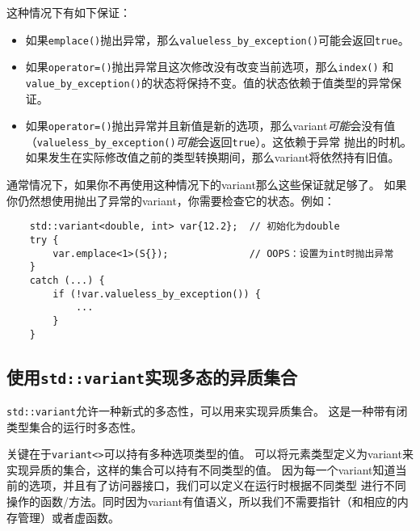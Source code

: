 这种情况下有如下保证：
\begin{itemize}[leftmargin=*]
    \item 如果\texttt{emplace()}抛出异常，那么\texttt{valueless\_by\_exception()}可能会返回\texttt{true}。
    \item 如果\texttt{operator=()}抛出异常且这次修改没有改变当前选项，那么\texttt{index()}
    和\texttt{value\_by\_exception()}的状态将保持不变。值的状态依赖于值类型的异常保证。
    \item 如果\texttt{operator=()}抛出异常并且新值是新的选项，那么variant\emph{可能}会没有值
    （\texttt{valueless\_by\_exception()}\emph{可能}会返回\texttt{true}）。这依赖于异常
    抛出的时机。如果发生在实际修改值之前的类型转换期间，那么variant将依然持有旧值。
\end{itemize}
通常情况下，如果你不再使用这种情况下的variant那么这些保证就足够了。
如果你仍然想使用抛出了异常的variant，你需要检查它的状态。例如：
\begin{lstlisting}
    std::variant<double, int> var{12.2};  // 初始化为double
    try {
        var.emplace<1>(S{});              // OOPS：设置为int时抛出异常
    }
    catch (...) {
        if (!var.valueless_by_exception()) {
            ...
        }
    }
\end{lstlisting}

\subsection{使用\texttt{std::variant}实现多态的异质集合}
\texttt{std::variant}允许一种新式的多态性，可以用来实现异质集合。
这是一种带有闭类型集合的运行时多态性。

关键在于\texttt{variant<>}可以持有多种选项类型的值。
可以将元素类型定义为variant来实现异质的集合，这样的集合可以持有不同类型的值。
因为每一个variant知道当前的选项，并且有了访问器接口，我们可以定义在运行时根据不同类型
进行不同操作的函数/方法。同时因为variant有值语义，所以我们不需要指针（和相应的内存管理）或者虚函数。

